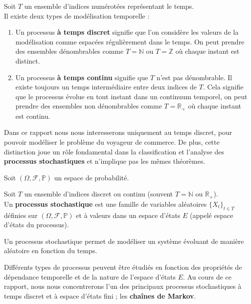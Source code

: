 \documentclass{article}
\begin{document}
\begin{tcolorbox}[colback=white,colframe=blue!80!black,title=Temps Discret et Temps Continu]
Soit $T$ un ensemble d'indices numérotées représentant le temps. \\

Il existe deux types de modélisation temporelle :
\begin{enumerate}[leftmargin=5em, label=(\arabic*)]
    \item Un processus \textbf{à temps discret} signifie que l'on considère les valeurs de la modélisation comme espacées régulièrement dans le temps.
          On peut prendre des ensembles dénombrables comme $T = \mathbb{N}$ ou $T = \mathbb{Z}$ où chaque instant est distinct.
    \item Un processus \textbf{à temps continu} signifie que $T$ n'est pas dénombrable. Il existe toujours un temps intermédiaire entre deux indices de $T$.
          Cela signifie que le processus évolue en tout instant dans un continuum temporel, on peut prendre des ensembles non dénombrables comme $T = \mathbb{R}_+$ où chaque instant est continu.
\end{enumerate}
\end{tcolorbox}

Dans ce rapport nous nous interesserons uniquement au temps discret, pour pouvoir modéliser le problème du voyageur de commerce.
De plus, cette distinction joue un rôle fondamental dans la classification et l'analyse des \textbf{processus stochastiques} et n'implique pas les mêmes théorèmes. \\

\begin{tcolorbox}[colback=white,colframe=blue!80!black,title=Processus Stochastique]
Soit $(\Omega, \mathcal{F}, \mathbb{P})$ un espace de probabilité.

Soit $T$ un ensemble d'indices discret ou continu (souvent $T = \mathbb{N}$ ou $\mathbb{R}_+$). \\

Un \textbf{processus stochastique} est une famille de variables aléatoires $\{X_t\}_{t \in T}$ définies sur $(\Omega, \mathcal{F}, \mathbb{P})$ et à valeurs dans un espace d'états $E$ (appelé espace d'états du processus).
\end{tcolorbox}

Un processus stochastique permet de modéliser un système évoluant de manière aléatoire en fonction du temps.

Différents types de processus peuvent être étudiés en fonction des propriétés de dépendance temporelle et de la nature de l'espace d'états $E$.
Au cours de ce rapport, nous nous concentrerons l'un des principaux processus stochastiques à temps discret et à espace d'états fini ; les \textbf{chaînes de Markov}. \\
\end{document}
